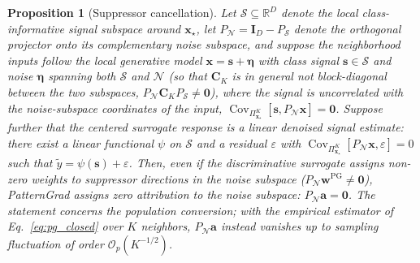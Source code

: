 \documentclass[pdflatex,sn-mathphys-num]{sn-jnl}
\theoremstyle{thmstyleone}
\newtheorem{proposition}[theorem]{Proposition}
\theoremstyle{thmstyletwo}%
\theoremstyle{thmstylethree}%
\begin{document}
\begin{proposition}[Suppressor cancellation]\label{prop:suppression}
Let $\mathcal{S} \subseteq \mathbb{R}^{D}$ denote the local class-informative signal subspace around $\mathbf{x}_\star$, let $P_{\mathcal{N}} = \mathbf{I}_D - P_{\mathcal{S}}$ denote the orthogonal projector onto its complementary noise subspace, and suppose the neighborhood inputs follow the local generative model $\mathbf{x} = \mathbf{s} + \boldsymbol{\eta}$ with class signal $\mathbf{s} \in \mathcal{S}$ and noise $\boldsymbol{\eta}$ spanning both $\mathcal{S}$ and $\mathcal{N}$ (so that $\mathbf{C}_K$ is in general \emph{not} block-diagonal between the two subspaces, $P_{\mathcal{N}}\mathbf{C}_K P_{\mathcal{S}} \neq \mathbf{0}$), where the signal is uncorrelated with the noise-subspace coordinates of the input, $\operatorname{Cov}_{\Pi^K_{\mathbf{x}_\star}}[\mathbf{s}, P_{\mathcal{N}}\mathbf{x}] = \mathbf{0}$. Suppose further that the centered surrogate response is a linear denoised signal estimate: there exist a linear functional $\psi$ on $\mathcal{S}$ and a residual $\varepsilon$ with $\operatorname{Cov}_{\Pi^K_{\mathbf{x}_\star}}[P_{\mathcal{N}}\mathbf{x}, \varepsilon] = 0$ such that $\tilde{y} = \psi(\mathbf{s}) + \varepsilon$. Then, even if the discriminative surrogate assigns non-zero weights to suppressor directions in the noise subspace ($P_{\mathcal{N}}\mathbf{w}^{\text{PG}} \neq \mathbf{0}$), PatternGrad assigns zero attribution to the noise subspace: $P_{\mathcal{N}}\mathbf{a} = \mathbf{0}$. The statement concerns the population conversion; with the empirical estimator of Eq.~\eqref{eq:pg_closed} over $K$ neighbors, $P_{\mathcal{N}}\mathbf{a}$ instead vanishes up to sampling fluctuation of order $\mathcal{O}_p(K^{-1/2})$.
\end{proposition}
\end{document}
